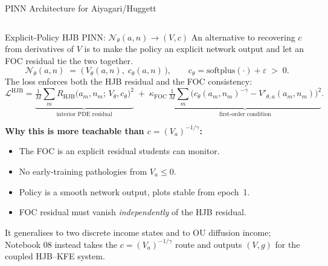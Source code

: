 \documentclass[aspectratio=169,11pt]{beamer}
\newcommand{\emphc}[1]{\textcolor{harvardcrimson}{#1}}
\begin{document}
\begin{frame}{PINN Architecture for Aiyagari/Huggett}
\begin{columns}[T]
\begin{center}
\end{center}
\end{columns}
\end{frame}

\begin{frame}{Explicit-Policy HJB PINN: $\mathcal{N}_\theta(a,n) \to (V, c)$}
\small
An alternative to recovering $c$ from derivatives of $V$ is to make the policy an explicit network output and let an FOC residual tie the two together.
\vspace{-0.3em}
\[
\mathcal{N}_\theta(a, n) \;=\; \bigl(\,V_\theta(a, n),\; c_\theta(a, n)\,\bigr),
\qquad c_\theta = \mathrm{softplus}(\cdot) + \varepsilon \;>\; 0.
\]
The loss enforces \emphc{both} the HJB residual \emphc{and} the FOC consistency:
\vspace{-0.3em}
\[
\mathcal{L}^{\text{HJB}} =
\underbrace{\tfrac{1}{M}\sum_m R_{\text{HJB}}\bigl(a_m, n_m;\, V_\theta, c_\theta\bigr)^2}_{\text{interior PDE residual}}
\;+\;
\kappa_{\text{FOC}}\,\underbrace{\tfrac{1}{M}\sum_m \bigl(c_\theta(a_m,n_m)^{-\gamma} - V'_{\theta,a}(a_m,n_m)\bigr)^2}_{\text{first-order condition}}.
\]

\textbf{Why this is more teachable than $c = (V_a)^{-1/\gamma}$:}
\begin{itemize}\itemsep0pt
    \item The FOC is an \emphc{explicit residual} students can monitor.
    \item No early-training pathologies from $V_a \le 0$.
    \item Policy is a smooth network output, plots stable from epoch~1.
    \item FOC residual must vanish \emph{independently} of the HJB residual.
\end{itemize}

{\footnotesize It generalises to two discrete income states and to OU diffusion income; Notebook 08 instead takes the $c=(V_a)^{-1/\gamma}$ route and outputs $(V,g)$ for the coupled HJB--KFE system.}
\end{frame}
\end{document}
